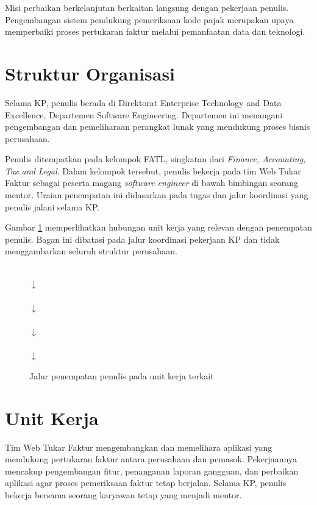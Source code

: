 Misi perbaikan berkelanjutan berkaitan langsung dengan pekerjaan penulis. Pengembangan sistem pendukung pemeriksaan kode pajak merupakan upaya memperbaiki proses pertukaran faktur melalui pemanfaatan data dan teknologi.
\section{Struktur Organisasi}
\label{sec:struktur_organisasi}
Selama KP, penulis berada di Direktorat Enterprise Technology and Data Excellence, Departemen Software Engineering. Departemen ini menangani pengembangan dan pemeliharaan perangkat lunak yang mendukung proses bisnis perusahaan.

Penulis ditempatkan pada kelompok \label{abbr:FATL}FATL, singkatan dari \textit{Finance, Accounting, Tax and Legal}. Dalam kelompok tersebut, penulis bekerja pada tim Web Tukar Faktur sebagai peserta magang \textit{software engineer} di bawah bimbingan seorang mentor. Uraian penempatan ini didasarkan pada tugas dan jalur koordinasi yang penulis jalani selama KP.

Gambar \ref{fig:struktur-penempatan} memperlihatkan hubungan unit kerja yang relevan dengan penempatan penulis. Bagan ini dibatasi pada jalur koordinasi pekerjaan KP dan tidak menggambarkan seluruh struktur perusahaan.

\begin{figure}[htbp]
    \centering
    \\[0.25em]
    $\downarrow$\\[0.25em]
    \\[0.25em]
    $\downarrow$\\[0.25em]
    \\[0.25em]
    $\downarrow$\\[0.25em]
    \\[0.25em]
    $\downarrow$\\[0.25em]
    \caption{Jalur penempatan penulis pada unit kerja terkait}
    \label{fig:struktur-penempatan}
\end{figure}
\section{Unit Kerja}
\label{sec:unit_kerja}
Tim Web Tukar Faktur mengembangkan dan memelihara aplikasi yang mendukung pertukaran faktur antara perusahaan dan pemasok. Pekerjaannya mencakup pengembangan fitur, penanganan laporan gangguan, dan perbaikan aplikasi agar proses pemeriksaan faktur tetap berjalan. Selama KP, penulis bekerja bersama seorang karyawan tetap yang menjadi mentor.


